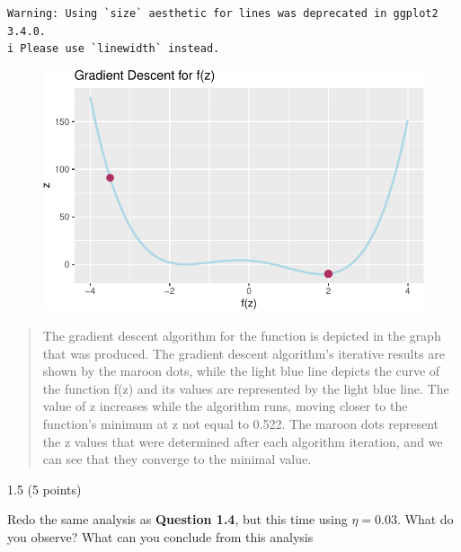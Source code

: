 \documentclass[
  letterpaper,
  DIV=11,
  numbers=noendperiod]{scrartcl}
\begin{document}
\begin{verbatim}
Warning: Using `size` aesthetic for lines was deprecated in ggplot2 3.4.0.
i Please use `linewidth` instead.
\end{verbatim}

\begin{figure}[H]

{\centering \includegraphics{index_files/figure-pdf/unnamed-chunk-5-1.pdf}

}

\end{figure}

\begin{quote}
The gradient descent algorithm for the function is depicted in the graph
that was produced. The gradient descent algorithm's iterative results
are shown by the maroon dots, while the light blue line depicts the
curve of the function f(z) and its values are represented by the light
blue line. The value of z increases while the algorithm runs, moving
closer to the function's minimum at z not equal to 0.522. The maroon
dots represent the z values that were determined after each algorithm
iteration, and we can see that they converge to the minimal value.
\end{quote}

1.5 (5 points)

Redo the same analysis as \textbf{Question 1.4}, but this time using
\(\eta = 0.03\). What do you observe? What can you conclude from this
analysis
\end{document}
